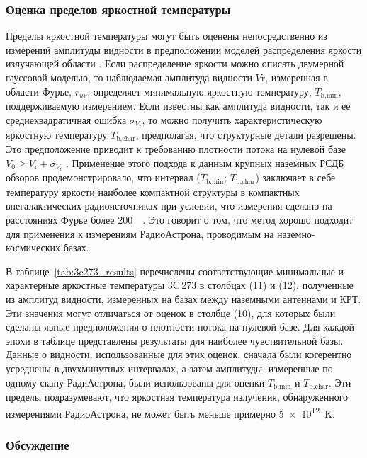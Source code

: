 \subsubsection{Оценка пределов яркостной температуры}

Пределы яркостной температуры могут быть оценены непосредственно из измерений амплитуды видности в
предположении моделей распределения яркости излучающей области \cite{Lobanov_2015a}. Если
распределение яркости можно описать двумерной гауссовой моделью, то наблюдаемая амплитуда видности
$V\text{r}$, измеренная в области Фурье, $r_{uv}$, определяет минимальную яркостную температуру,
$T_\text{b,min}$, поддерживаемую измерением. Если известны как амплитуда видности, так и ее
среднеквадратичная ошибка $\sigma_{V_\text{r}}$, то можно получить характеристическую яркостную
температуру $T_\text{b,char}$, предполагая, что структурные детали разрешены. Это предположение
приводит к требованию плотности потока на нулевой базе $V_0 \geqslant V_\text{r} +
\sigma_{V_\text{r}}$ \cite{Lobanov_2015a}. Применение этого подхода к данным  крупных наземных РСДБ
обзоров продемонстрировало, что интервал ($T_\text{b,min}$; $T_\text{b,char}$) заключает в себе
температуру яркости наиболее компактной структуры в компактных внегалактических радиоисточниках при
условии, что измерения сделано на расстояниях Фурье более \SI{200}{\mega\la}. Это говорит о том, что
метод хорошо подходит для применения к измерениям РадиоАстрона, проводимым на наземно-космических
базах.

В таблице~\ref{tab:3c273_results} перечислены соответствующие минимальные и характерные яркостные
температуры 3C\,273 в столбцах (11) и (12), полученные из амплитуд видности, измеренных на базах
между наземными антеннами и КРТ. Эти значения могут отличаться от оценок в столбце (10), для которых
были сделаны явные предположения о плотности потока на нулевой базе. Для каждой эпохи в таблице
представлены результаты для наиболее чувствительной базы. Данные о видности, использованные для этих
оценок, сначала были когерентно усреднены в двухминутных интервалах, а затем амплитуды, измеренные
по одному скану РадиАстрона, были использованы для оценки $T_\text{b,min}$ и $T_\text{b,char}$. Эти
пределы подразумевают, что яркостная температура излучения, обнаруженного измерениями РадиоАстрона,
не может быть меньше примерно \SI{5e12}{\kelvin}.

\subsubsection{Обсуждение}

